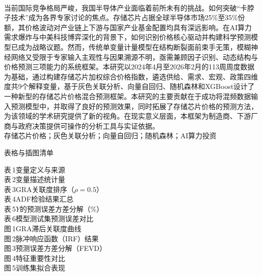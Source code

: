 \documentclass[a4paper,12pt,fontset=fandol]{ctexart}
\begin{document}
\quad
\\
\hspace*{2em}当前国际竞争格局严峻，我国半导体产业面临着前所未有的挑战。如何突破“卡脖子技术”成为各界专家讨论的焦点。存储芯片占据全球半导体市场25\%至35\%份额，其价格波动对产业链上下游与国家产业基金配置均具有深远影响。在AI算力需求爆炸与中美科技博弈深化的背景下，如何识别价格核心驱动并构建科学预测模型已成为战略议题。然而，传统单变量计量模型在结构断裂面前束手无策，模糊神经网络又受限于专家输入主观性与因果溯源不明，亟需兼顾因子识别、动态结构与价格预测三项能力的系统框架。本研究以2024年4月至2026年2月的113周周度数据为基础，通过构建存储芯片加权综合价格指数，遴选供给、需求、宏观、政策四维度共9个解释变量，基于灰色关联分析、向量自回归、随机森林和XGBoost设计了一种新型的存储芯片价格混合预测框架。本研究的主要贡献在于成功将混频数据输入预测模型中，并取得了良好的预测效果，同时拓展了存储芯片价格的预测方法，为该领域的学术研究提供了新的视角。在现实意义层面，本框架为制造商、下游厂商与政府决策提供可操作的分析工具与实证依据。
\\

\vspace{6pt}
存储芯片价格；灰色关联分析；向量自回归；随机森林；AI算力投资

\newpage
\begingroup
\singlespacing
\tableofcontents
\endgroup
\newpage

\begin{center}
{\heiti{} 表格与插图清单}
\end{center}
\vspace{6pt}

\noindent 表\,1\quad 变量定义与来源 \\
表\,2\quad 变量描述统计量 \\
表\,3\quad GRA关联度排序（$\rho = 0.5$）\\
表\,4\quad ADF检验结果汇总 \\
表\,5\quad $Y$的预测误差方差分解（\%）\\
表\,6\quad 模型测试集预测误差对比 \\[12pt]
图\,1\quad GRA滞后关联度曲线 \\
图\,2\quad 脉冲响应函数（IRF）结果\\
图\,3\quad 预测误差方差分解（FEVD）\\
图\,4\quad 特征重要性对比 \\
图\,5\quad 训练集拟合表现

\newpage
\end{document}
